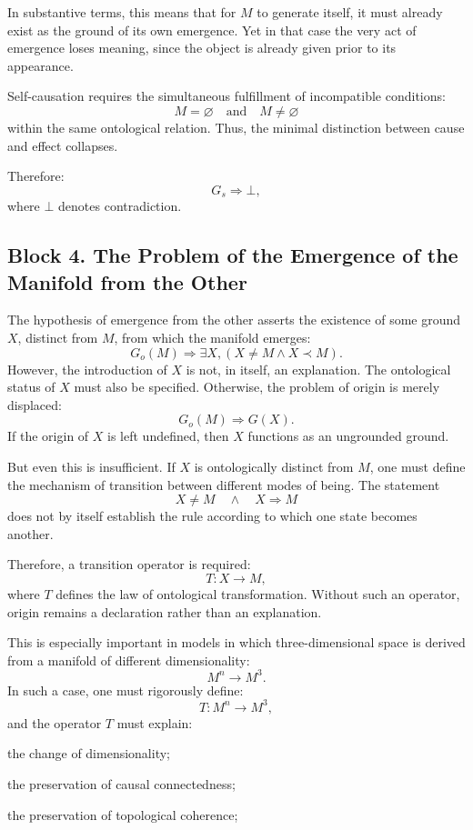 \documentclass[12pt,a4paper]{article}
\theoremstyle{definition}
\begin{document}
In substantive terms, this means that for \(M\) to generate itself, it must already exist as the ground of its own emergence. Yet in that case the very act of emergence loses meaning, since the object is already given prior to its appearance.

Self-causation requires the simultaneous fulfillment of incompatible conditions:
\[
M=\varnothing
\quad\text{and}\quad
M\neq\varnothing
\]
within the same ontological relation. Thus, the minimal distinction between cause and effect collapses.

Therefore:
\[
G_s\Rightarrow\bot,
\]
where \(\bot\) denotes contradiction.



\subsection{Block 4. The Problem of the Emergence of the Manifold from the Other}
The hypothesis of emergence from the other asserts the existence of some ground \(X\), distinct from \(M\), from which the manifold emerges:
\[
G_o(M)\Rightarrow \exists X,(X\neq M\land X\prec M).
\]
However, the introduction of \(X\) is not, in itself, an explanation. The ontological status of \(X\) must also be specified. Otherwise, the problem of origin is merely displaced:
\[
G_o(M)\Rightarrow G(X).
\]
If the origin of \(X\) is left undefined, then \(X\) functions as an ungrounded ground.

But even this is insufficient. If \(X\) is ontologically distinct from \(M\), one must define the mechanism of transition between different modes of being. The statement
\[
X\neq M\quad\land\quad X\Rightarrow M
\]
does not by itself establish the rule according to which one state becomes another.

Therefore, a transition operator is required:
\[
T:X\to M,
\]
where \(T\) defines the law of ontological transformation. Without such an operator, origin remains a declaration rather than an explanation.

This is especially important in models in which three-dimensional space is derived from a manifold of different dimensionality:
\[
M^n\to M^3.
\]
In such a case, one must rigorously define:
\[
T:M^n\to M^3,
\]
and the operator \(T\) must explain:

the change of dimensionality;

the preservation of causal connectedness;

the preservation of topological coherence;
\end{document}
